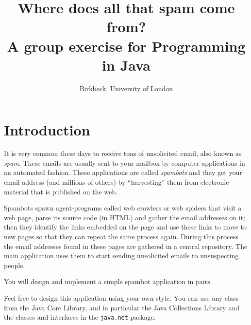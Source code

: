 \documentclass{article}
\begin{document}
\title{Where does all that spam come from? \\ \large{A group exercise for Programming in Java}}
\author{Birkbeck, University of London}
\date{}

\maketitle

\vspace{1cm}

\section{Introduction}
\label{sec:introduction}

It is very common these days to receive tons of unsolicited email,
also known as \emph{spam}. These emails are usually sent to your
mailbox by computer applications in an automated fashion. These
applications are called \emph{spambots} and they get your email
address (and millions of others) by “harvesting” them from electronic
material that is published on the web. 

Spambots spawn agent-programs called web crawlers or web spiders that
visit a web page, parse its source code (in HTML) and gather the email
addresses on it; then they identify the links embedded on the page and
use these links to move to new pages so that they can repeat the same
process again. During this process the email addresses found in these
pages are gathered in a central repository. The main application uses
them to start sending unsolicited emails to unsuspecting people.

You will design and implement a simple spambot application in pairs. 

Feel free to design this application using your own style. You can use
any class from the Java Core Library,
and in particular the Java
Collections Library and the classes and interfaces in the
\verb+java.net+ package. 

\vspace{1em}
\end{document}
